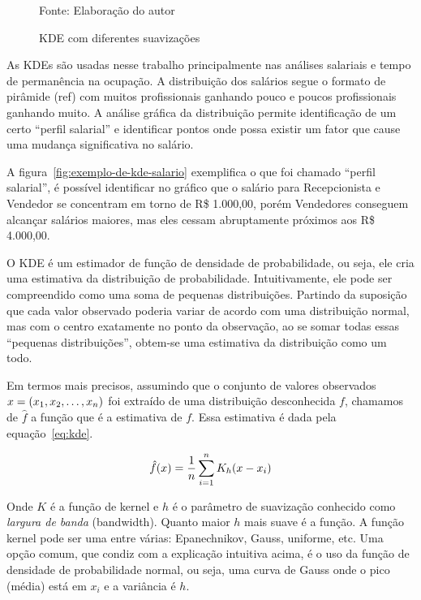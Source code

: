 \documentclass[12pt,a4paper]{article}
\newcommand{\source}[1]{\vspace{-10pt} \caption*{Fonte: {#1}} }
\begin{document}
\begin{figure}[ht]
{  }    
  \caption{KDE com diferentes suavizações}
  \label{fig:exemplo-de-kde}
  \source{Elaboração do autor}
\end{figure}

As KDEs são usadas nesse trabalho principalmente nas análises salariais e tempo de permanência na ocupação. A distribuição dos salários segue o formato de pirâmide (ref) com muitos profissionais ganhando pouco e poucos profissionais ganhando muito. A análise gráfica da distribuição permite identificação de um certo \enquote{perfil salarial} e identificar pontos onde possa existir um fator que cause uma mudança significativa no salário.

A figura~\ref{fig:exemplo-de-kde-salario} exemplifica o que foi chamado \enquote{perfil salarial}, é possível identificar no gráfico que o salário para Recepcionista e Vendedor se concentram em torno de R\$ 1.000,00, porém Vendedores conseguem alcançar salários maiores, mas eles cessam abruptamente próximos aos R\$ 4.000,00.~

O KDE é um estimador de função de densidade de probabilidade, ou seja, ele cria uma estimativa da distribuição de probabilidade. Intuitivamente, ele pode ser compreendido como uma soma de pequenas distribuições. Partindo da suposição que cada valor observado poderia variar de acordo com uma distribuição normal, mas com o centro exatamente no ponto da observação, ao se somar todas essas \enquote{pequenas distribuições}, obtem-se uma estimativa da distribuição como um todo.

Em termos mais precisos, assumindo que o conjunto de valores observados $\boldmath{x} = (x_1, x_2, \ldots, x_n)$ foi extraído de uma distribuição desconhecida $f$, chamamos de $\hat{f}$ a função que é a estimativa de $f$. Essa estimativa é dada pela equação~\ref{eq:kde}.

\begin{equation} \label{eq:kde}
\hat{f}(\boldmath{x}) = \frac{1}{n}\sum_{i=1}^{n}{K_h(x - x_i)}
\end{equation}

Onde $K$ é a função de kernel e $h$ é o parâmetro de suavização conhecido como \textit{largura de banda} (bandwidth). Quanto maior $h$ mais suave é a função. A função kernel pode ser uma entre várias: Epanechnikov, Gauss, uniforme, etc. Uma opção comum, que condiz com a explicação intuitiva acima, é o uso da função de densidade de probabilidade normal, ou seja, uma curva de Gauss onde o pico (média) está em $x_i$ e a variância é $h$.
\end{document}
